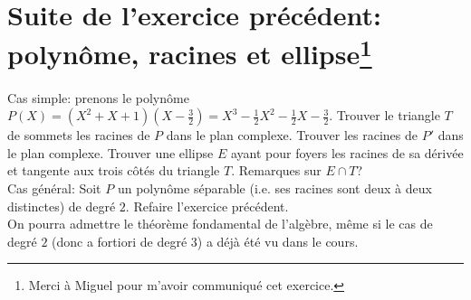 \documentclass{article}
\begin{document}
\section{Suite de l'exercice pr\'ec\'edent: polyn\^ome, racines et ellipse\protect\footnote{Merci \`a Miguel pour m'avoir communiqu\'e cet exercice.}}
Cas simple: prenons le polyn\^ome $P(X)=(X^2+X+1)(X-\frac{3}{2})=X^3-\frac{1}{2}X^2-\frac{1}{2}X-\frac{3}{2}$. Trouver le triangle $T$ de sommets les racines de $P$ dans le plan complexe. Trouver les racines de $P'$ dans le plan complexe. Trouver une ellipse $E$ ayant pour foyers les racines de sa d\'eriv\'ee et tangente aux trois c\^ot\'es du triangle $T$. Remarques sur $E\cap T$?\\
Cas g\'en\'eral: Soit $P$ un polyn\^ome s\'eparable (i.e. ses racines sont deux \`a deux distinctes) de degr\'e $2$. Refaire l'exercice pr\'ec\'edent.\\
On pourra admettre le th\'eor\`eme fondamental de l'alg\`ebre, m\^eme si le cas de degr\'e $2$ (donc a fortiori de degr\'e $3$) a d\'ej\`a \'et\'e vu dans le cours.
\end{document}
